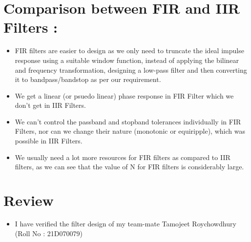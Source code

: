 \documentclass{article}
\begin{document}
\section{Comparison between FIR and IIR Filters :}
\begin{itemize}
    \item FIR filters are easier to design as we only need to truncate the ideal impulse response using a suitable window function, instead of applying the bilinear and frequency transformation, designing a low-pass filter and then converting it to bandpass/bandstop as per our requirement.
    \item We get a linear (or psuedo linear) phase response in FIR Filter which we don't get in IIR Filters.
    \item We can't control the passband and stopband tolerances individually in FIR Filters, nor can we change their nature (monotonic or equiripple), which was possible in IIR Filters.
    \item We usually need a lot more resources for FIR filters as compared to IIR
    filters, as we can see that the value of N for FIR filters is considerably
    large.
\end{itemize}
\section{Review}

\begin{itemize}
    \item I have verified the filter design of my team-mate Tamojeet Roychowdhury (Roll No : 21D070079) 
\end{itemize}
\end{document}
